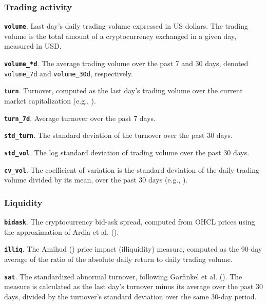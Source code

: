 \documentclass[
  12pt,
  a4paper,
  openany]{scrbook}
\begin{document}
\subsubsection{Trading activity}\label{trading-activity}

\textbf{\texttt{volume}}. Last day's daily trading volume expressed in
US dollars. The trading volume is the total amount of a cryptocurrency
exchanged in a given day, measured in USD.

\textbf{\texttt{volume\_*d}}. The average trading volume over the past 7
and 30 days, denoted \texttt{volume\_7d} and \texttt{volume\_30d},
respectively.

\textbf{\texttt{turn}}. Turnover, computed as the last day's trading
volume over the current market capitalization (e.g.,
).

\textbf{\texttt{turn\_7d}}. Average turnover over the past 7 days.

\textbf{\texttt{std\_turn}}. The standard deviation of the turnover over
the past 30 days.

\textbf{\texttt{std\_vol}}. The log standard deviation of trading volume
over the past 30 days.

\textbf{\texttt{cv\_vol}}. The coefficient of variation is the standard
deviation of the daily trading volume divided by its mean, over the past
30 days (e.g., ).

\subsubsection{Liquidity}\label{liquidity}

\textbf{\texttt{bidask}}. The cryptocurrency bid-ask spread, computed
from OHCL prices using the approximation of Ardia et al.
().

\textbf{\texttt{illiq}}. The Amihud
() price impact
(illiquidity) measure, computed as the 90-day average of the ratio of
the absolute daily return to daily trading volume.

\textbf{\texttt{sat}}. The standardized abnormal turnover, following
Garfinkel et al. ().
The measure is calculated as the last day's turnover minus its average
over the past 30 days, divided by the turnover's standard deviation over
the same 30-day period.
\end{document}
